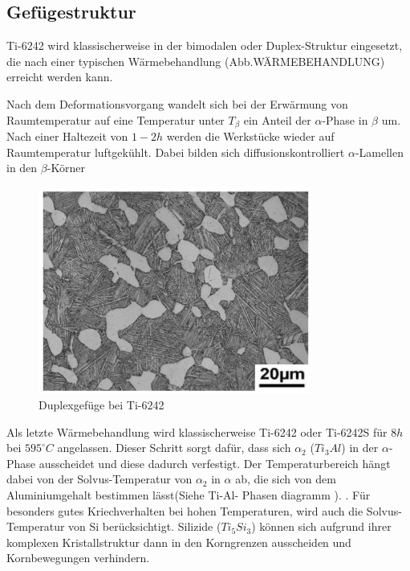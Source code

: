 
\subsection{Gefügestruktur}

Ti-6242 wird klassischerweise in der bimodalen oder Duplex-Struktur eingesetzt, die nach einer typischen Wärmebehandlung (Abb.WÄRMEBEHANDLUNG) erreicht werden kann.

Nach dem Deformationsvorgang wandelt sich bei der Erwärmung von Raumtemperatur  auf eine Temperatur unter $T_{\beta}$  ein Anteil der $\alpha$-Phase in $\beta$ um. Nach einer Haltezeit von $1-2h$ werden die Werkstücke wieder auf Raumtemperatur luftgekühlt.
Dabei bilden sich diffusionskontrolliert $\alpha$-Lamellen in den  $\beta$-Körner

\begin{figure}[H]
	\centering
	\includegraphics[width=0.8\textwidth]{Bilder/Abbildung 4}
	\caption{Duplexgefüge bei Ti-6242}
	\label{fig:L.M}
\end{figure}


Als letzte Wärmebehandlung wird klassischerweise  Ti-6242 oder Ti-6242S für  $8 h$ bei $595^\circ C$ angelassen. Dieser Schritt sorgt dafür, dass sich $\alpha_2$ ($Ti_3Al$) in der $\alpha$-Phase ausscheidet und diese dadurch verfestigt. Der Temperaturbereich hängt dabei von der Solvus-Temperatur von $\alpha_2$ in $\alpha$ ab, die sich von dem Aluminiumgehalt bestimmen lässt(Siehe Ti-Al- Phasen diagramm ). \cite{Lutjering.2007}.
Für besonders gutes Kriechverhalten bei hohen Temperaturen, wird auch die Solvus-Temperatur von Si berücksichtigt. Silizide ($Ti_5Si_3$) können sich aufgrund ihrer komplexen Kristallstruktur dann in den Korngrenzen ausscheiden und Kornbewegungen verhindern.

